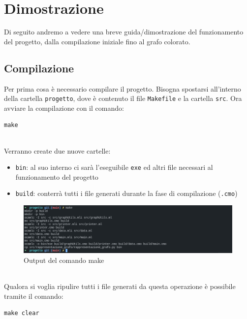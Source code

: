 \section{Dimostrazione}
Di seguito andremo a vedere una breve guida/dimostrazione del funzionamento del progetto, dalla compilazione iniziale fino al grafo colorato.

\subsection{Compilazione}
Per prima cosa è necessario compilare il progetto. Bisogna spostarsi all'interno della cartella \lstinline[style=cmd]|progetto|, dove è contenuto il file \lstinline[style=cmd]|Makefile| e la cartella \lstinline[style=cmd]|src|. Ora avviare la compilazione con il comando:

\begin{center}
	\lstinline[style=cmd]|make|
\end{center}
\ \\
Verranno create due nuove cartelle: 

\begin{itemize}
	\item \lstinline[style=cmd]|bin|: al suo interno ci sarà l'eseguibile \lstinline[style=cmd]|exe| ed altri file necessari al funzionamento del progetto
	\item \lstinline[style=cmd]|build|: conterrà tutti i file generati durante la fase di compilazione (\lstinline[style=cmd]|.cmo|)
\end{itemize}

\begin{figure}[H]
	\centering
	\includegraphics[width=\textwidth]{img/make.png}
	\caption{Output del comando make}
\end{figure}
\ \\
Qualora si voglia ripulire tutti i file generati da questa operazione è possibile tramite il comando:

\begin{center}
	\lstinline[style=cmd]|make clear|
\end{center}

